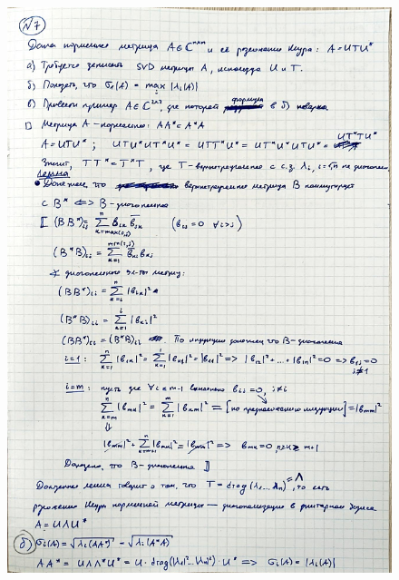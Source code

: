 \documentclass{article}
\begin{document}
		\begin{figure}[h!]
			\includegraphics[width=0.95\linewidth]{handwritten/matcomp_hw1_7a}
		\end{figure}
	
\end{document}
